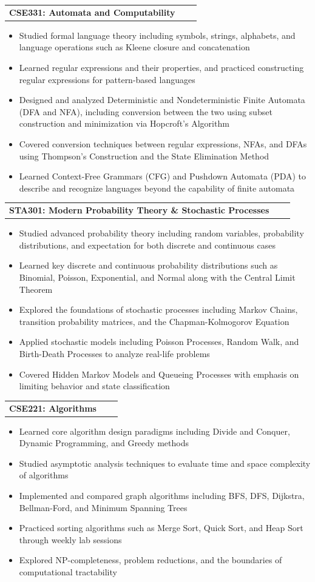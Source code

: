 \documentclass[a4paper,12pt]{article}
\makeatletter
\newenvironment{joblong}[2]
    {
    \begin{tabularx}{\linewidth}{@{}l X r@{}}
    \textbf{#1} & \hfill &  #2 \\[3.75pt]
    \end{tabularx}
    \begin{minipage}[t]{\linewidth}
    \begin{itemize}[nosep,after=\strut, leftmargin=1em, itemsep=3pt,label=--]
    }
    {
    \end{itemize}
    \end{minipage}    
    }
\makeatother
\begin{document}
\begin{joblong}{CSE331: Automata and Computability}{}
    \item Studied formal language theory including symbols, strings, alphabets, and language operations such as Kleene closure and concatenation
    \item Learned regular expressions and their properties, and practiced constructing regular expressions for pattern-based languages
    \item Designed and analyzed Deterministic and Nondeterministic Finite Automata (DFA and NFA), including conversion between the two using subset construction and minimization via Hopcroft's Algorithm
    \item Covered conversion techniques between regular expressions, NFAs, and DFAs using Thompson's Construction and the State Elimination Method
    \item Learned Context-Free Grammars (CFG) and Pushdown Automata (PDA) to describe and recognize languages beyond the capability of finite automata
\end{joblong}

\begin{joblong}{STA301: Modern Probability Theory \& Stochastic Processes}{}
    \item Studied advanced probability theory including random variables, probability distributions, and expectation for both discrete and continuous cases
    \item Learned key discrete and continuous probability distributions such as Binomial, Poisson, Exponential, and Normal along with the Central Limit Theorem
    \item Explored the foundations of stochastic processes including Markov Chains, transition probability matrices, and the Chapman-Kolmogorov Equation
    \item Applied stochastic models including Poisson Processes, Random Walk, and Birth-Death Processes to analyze real-life problems
    \item Covered Hidden Markov Models and Queueing Processes with emphasis on limiting behavior and state classification
\end{joblong}

\begin{joblong}{CSE221: Algorithms}{}
    \item Learned core algorithm design paradigms including Divide and Conquer, Dynamic Programming, and Greedy methods
    \item Studied asymptotic analysis techniques to evaluate time and space complexity of algorithms
    \item Implemented and compared graph algorithms including BFS, DFS, Dijkstra, Bellman-Ford, and Minimum Spanning Trees
    \item Practiced sorting algorithms such as Merge Sort, Quick Sort, and Heap Sort through weekly lab sessions
    \item Explored NP-completeness, problem reductions, and the boundaries of computational tractability
\end{joblong}
\end{document}
